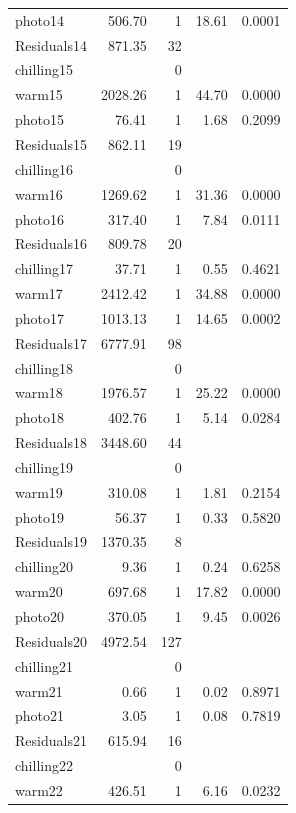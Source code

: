 \documentclass{article}\usepackage[]{graphicx}\usepackage[]{color}
\begin{document}
\begin{table}[ht]
\begin{tabular}{lrrrr}
  photo14 & 506.70 & 1 & 18.61 & 0.0001 \\ 
  Residuals14 & 871.35 & 32 &  &  \\ 
   \hline
chilling15 &  & 0 &  &  \\ 
  warm15 & 2028.26 & 1 & 44.70 & 0.0000 \\ 
  photo15 & 76.41 & 1 & 1.68 & 0.2099 \\ 
  Residuals15 & 862.11 & 19 &  &  \\ 
   \hline
chilling16 &  & 0 &  &  \\ 
  warm16 & 1269.62 & 1 & 31.36 & 0.0000 \\ 
  photo16 & 317.40 & 1 & 7.84 & 0.0111 \\ 
  Residuals16 & 809.78 & 20 &  &  \\ 
   \hline
chilling17 & 37.71 & 1 & 0.55 & 0.4621 \\ 
  warm17 & 2412.42 & 1 & 34.88 & 0.0000 \\ 
  photo17 & 1013.13 & 1 & 14.65 & 0.0002 \\ 
  Residuals17 & 6777.91 & 98 &  &  \\ 
   \hline
chilling18 &  & 0 &  &  \\ 
  warm18 & 1976.57 & 1 & 25.22 & 0.0000 \\ 
  photo18 & 402.76 & 1 & 5.14 & 0.0284 \\ 
  Residuals18 & 3448.60 & 44 &  &  \\ 
   \hline
chilling19 &  & 0 &  &  \\ 
  warm19 & 310.08 & 1 & 1.81 & 0.2154 \\ 
  photo19 & 56.37 & 1 & 0.33 & 0.5820 \\ 
  Residuals19 & 1370.35 & 8 &  &  \\ 
   \hline
chilling20 & 9.36 & 1 & 0.24 & 0.6258 \\ 
  warm20 & 697.68 & 1 & 17.82 & 0.0000 \\ 
  photo20 & 370.05 & 1 & 9.45 & 0.0026 \\ 
  Residuals20 & 4972.54 & 127 &  &  \\ 
   \hline
chilling21 &  & 0 &  &  \\ 
  warm21 & 0.66 & 1 & 0.02 & 0.8971 \\ 
  photo21 & 3.05 & 1 & 0.08 & 0.7819 \\ 
  Residuals21 & 615.94 & 16 &  &  \\ 
   \hline
chilling22 &  & 0 &  &  \\ 
  warm22 & 426.51 & 1 & 6.16 & 0.0232 \\ 

\end{tabular}
\end{table}
\end{document}
